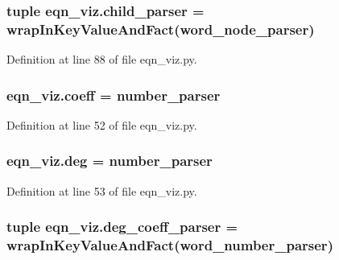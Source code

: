 \hypertarget{namespaceeqn__viz_a333b4ac72b3d28145584b60f44dc5230}{}
\subsubsection[{child\+\_\+parser}]{\setlength{\rightskip}{0pt plus 5cm}tuple eqn\+\_\+viz.\+child\+\_\+parser = {\bf wrap\+In\+Key\+Value\+And\+Fact}({\bf word\+\_\+node\+\_\+parser})}\label{namespaceeqn__viz_a333b4ac72b3d28145584b60f44dc5230}


Definition at line 88 of file eqn\+\_\+viz.\+py.

\hypertarget{namespaceeqn__viz_ae1292d980053c2a15be129430ee3ebb1}{}
\subsubsection[{coeff}]{\setlength{\rightskip}{0pt plus 5cm}eqn\+\_\+viz.\+coeff = {\bf number\+\_\+parser}}\label{namespaceeqn__viz_ae1292d980053c2a15be129430ee3ebb1}


Definition at line 52 of file eqn\+\_\+viz.\+py.

\hypertarget{namespaceeqn__viz_a1376f5d1deece596253f6876d746a500}{}
\subsubsection[{deg}]{\setlength{\rightskip}{0pt plus 5cm}eqn\+\_\+viz.\+deg = {\bf number\+\_\+parser}}\label{namespaceeqn__viz_a1376f5d1deece596253f6876d746a500}


Definition at line 53 of file eqn\+\_\+viz.\+py.

\hypertarget{namespaceeqn__viz_aa7fc0cae83db0b5d1e6d5c5842cea401}{}
\subsubsection[{deg\+\_\+coeff\+\_\+parser}]{\setlength{\rightskip}{0pt plus 5cm}tuple eqn\+\_\+viz.\+deg\+\_\+coeff\+\_\+parser = {\bf wrap\+In\+Key\+Value\+And\+Fact}({\bf word\+\_\+number\+\_\+parser})}\label{namespaceeqn__viz_aa7fc0cae83db0b5d1e6d5c5842cea401}


